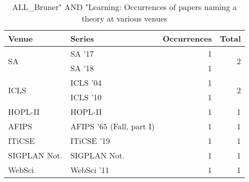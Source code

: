 \begin{table*}[t]
\begin{tabular}{llrr}
Venue & Series & Occurrences & Total\\\hline
\multirow{2}{*}{SA } & SA '17 & 1 & \multirow{2}{*}{2}\\
& SA '18 & 1 &\\
\multirow{2}{*}{ICLS } & ICLS '04 & 1 & \multirow{2}{*}{2}\\
& ICLS '10 & 1 &\\
\multirow{1}{*}{HOPL-II} & HOPL-II & 1 & \multirow{1}{*}{1}\\
\multirow{1}{*}{AFIPS } & AFIPS '65 (Fall, part I) & 1 & \multirow{1}{*}{1}\\
\multirow{1}{*}{ITiCSE } & ITiCSE '19 & 1 & \multirow{1}{*}{1}\\
\multirow{1}{*}{SIGPLAN Not.} & SIGPLAN Not. & 1 & \multirow{1}{*}{1}\\
\multirow{1}{*}{WebSci } & WebSci '11 & 1 & \multirow{1}{*}{1}\\
\end{tabular}
\caption{ALL\_Bruner" AND "Learning: Occurrences of papers naming a theory at various venues}
\end{table*}
